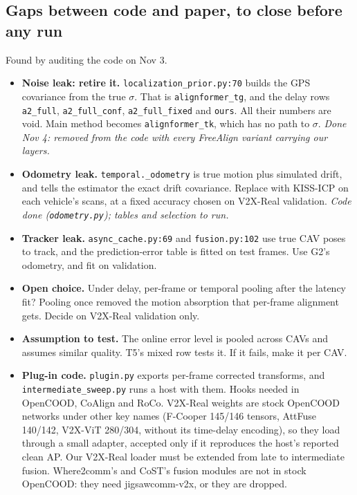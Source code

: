 \subsection*{Gaps between code and paper, to close before any run}
Found by auditing the code on Nov 3.
\begin{itemize}\setlength\itemsep{2pt}
  \item[\textbf{G1}] \textbf{Noise leak: retire it.} \texttt{localization\_prior.py:70} builds the GPS covariance from the true $\sigma$. That is \texttt{alignformer\_tg}, and the delay rows \texttt{a2\_full}, \texttt{a2\_full\_conf}, \texttt{a2\_full\_fixed} and \texttt{ours}. All their numbers are void. Main method becomes \texttt{alignformer\_tk}, which has no path to $\sigma$. \textit{Done Nov 4: removed from the code with every FreeAlign variant carrying our layers.}
  \item[\textbf{G2}] \textbf{Odometry leak.} \texttt{temporal.\_odometry} is true motion plus simulated drift, and tells the estimator the exact drift covariance. Replace with KISS-ICP on each vehicle's scans, at a fixed accuracy chosen on V2X-Real validation. \textit{Code done (\texttt{odometry.py}); tables and selection to run.}
  \item[\textbf{G3}] \textbf{Tracker leak.} \texttt{async\_cache.py:69} and \texttt{fusion.py:102} use true CAV poses to track, and the prediction-error table is fitted on test frames. Use G2's odometry, and fit on validation.
  \item[\textbf{G4}] \textbf{Open choice.} Under delay, per-frame or temporal pooling after the latency fit? Pooling once removed the motion absorption that per-frame alignment gets. Decide on V2X-Real validation only.
  \item[\textbf{G5}] \textbf{Assumption to test.} The online error level is pooled across CAVs and assumes similar quality. T5's mixed row tests it. If it fails, make it per CAV.
  \item[\textbf{G6}] \textbf{Plug-in code.} \texttt{plugin.py} exports per-frame corrected transforms, and \texttt{intermediate\_sweep.py} runs a host with them. Hooks needed in OpenCOOD, CoAlign and RoCo. V2X-Real weights are stock OpenCOOD networks under other key names (F-Cooper 145/146 tensors, AttFuse 140/142, V2X-ViT 280/304, without its time-delay encoding), so they load through a small adapter, accepted only if it reproduces the host's reported clean AP. Our V2X-Real loader must be extended from late to intermediate fusion. Where2comm's and CoST's fusion modules are not in stock OpenCOOD: they need jigsawcomm-v2x, or they are dropped.

\end{itemize}
